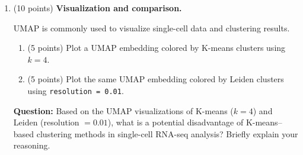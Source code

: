 \begin{enumerate}
\begin{enumerate}
    \item (5 points) Run the Leiden algorithm on the kNN graph with resolution parameter \texttt{resolution = 0.1}. Report the number of clusters obtained.
    
    \item (5 points) Compute the ARI between the Leiden cluster assignments (resolution $=0.1$) and \texttt{merged\_annotation}. Report and interpret the ARI value.
\end{enumerate}

\begin{solution}

\end{solution}

\vspace{20pt}

\item (10 points) \textbf{Visualization and comparison.}

UMAP is commonly used to visualize single-cell data and clustering results.

\begin{enumerate}
    \item (5 points) Plot a UMAP embedding colored by K-means clusters using $k=4$.
    \item (5 points) Plot the same UMAP embedding colored by Leiden clusters using \texttt{resolution = 0.01}.
\end{enumerate}

\textbf{Question:} Based on the UMAP visualizations of K-means ($k=4$) and Leiden (resolution $=0.01$), what is a potential disadvantage of K-means–based clustering methods in single-cell RNA-seq analysis? Briefly explain your reasoning.

\begin{solution}

\end{solution}

\end{enumerate}

\vspace{10pt}


